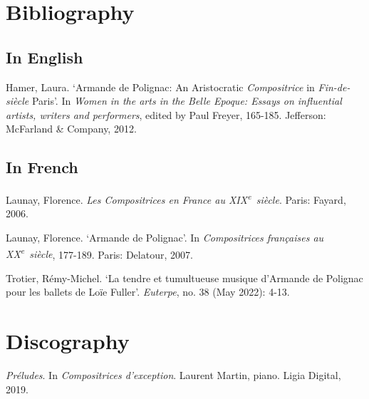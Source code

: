 \documentclass[a4paper, 12pt]{book}
\begin{document}
\begin{otherlanguage}{english}
\section*{Bibliography}

\subsection*{In English}

\begin{hangparas}{.5cm}{1}

  Hamer, Laura. `Armande de Polignac: An Aristocratic
  \emph{Compositrice} in \emph{Fin-de-siècle} Paris'. In \emph{Women
  in the arts in the Belle Epoque: Essays on influential artists,
  writers and performers}, edited by Paul Freyer, 165-185. Jefferson:
  McFarland \& Company, 2012.

\end{hangparas}

\vspace{\baselineskip}

\subsection*{In French}

\begin{hangparas}{.5cm}{1}

  Launay, Florence. \emph{Les Compositrices en France au
  XIX\textsuperscript{e}~siècle}. Paris: Fayard, 2006.
  
  \pagebreak
  
  Launay, Florence. `Armande de Polignac'. In \emph{Compositrices
  françaises au XX\textsuperscript{e}~siècle}, 177-189. Paris:
  Delatour, 2007.

  Trotier, Rémy-Michel. `La tendre et tumultueuse musique d'Armande de Polignac
  pour les ballets de Loïe Fuller'. \emph{Euterpe}, no. 38 (May 2022): 4-13.
    
\end{hangparas}

\vspace{\baselineskip}

\section*{Discography}

\begin{hangparas}{.5cm}{1}
  
  \emph{Préludes}. In \emph{Compositrices d'exception}. Laurent
  Martin, piano. Ligia Digital, 2019.


\end{hangparas}
\end{otherlanguage}
\end{document}

